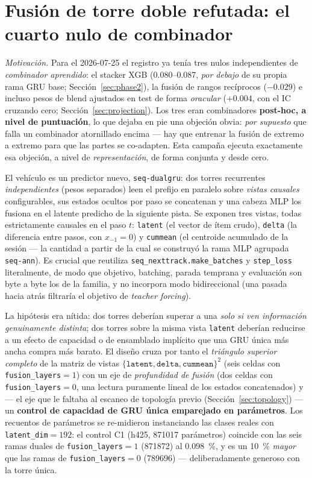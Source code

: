 \documentclass[11pt]{article}
\begin{document}
\section{Fusión de torre doble refutada: el cuarto nulo de combinador}
\label{sec:dualtower}
\emph{Motivación.} Para el 2026-07-25 el registro ya tenía tres nulos
independientes de \emph{combinador aprendido}: el stacker XGB
(\numrange{0.080}{0.087}, \emph{por debajo} de su propia rama GRU base;
Sección~\ref{sec:phase2}), la fusión de rangos recíprocos ($-\num{0.029}$) e
incluso pesos de blend ajustados en test de forma \emph{oracular}
($+\num{0.004}$, con el IC cruzando cero; Sección~\ref{sec:projection}). Los
tres eran combinadores \textbf{post-hoc, a nivel de puntuación}, lo que dejaba en
pie una objeción obvia: \emph{por supuesto} que falla un combinador atornillado
encima --- hay que entrenar la fusión de extremo a extremo para que las partes se
co-adapten. Esta campaña ejecuta exactamente esa objeción, a nivel de
\emph{representación}, de forma conjunta y desde cero.

El vehículo es un predictor nuevo, \texttt{seq-dualgru}: dos torres recurrentes
\emph{independientes} (pesos separados) leen el prefijo en paralelo sobre
\emph{vistas causales} configurables, sus estados ocultos por paso se concatenan
y una cabeza MLP los fusiona en el latente predicho de la siguiente pista. Se
exponen tres vistas, todas estrictamente causales en el paso $t$:
\texttt{latent} (el vector de ítem crudo), \texttt{delta} (la diferencia entre
pasos, con $x_{-1}=0$) y \texttt{cummean} (el centroide acumulado de la sesión
--- la cantidad a partir de la cual se construyó la rama MLP agrupada
\texttt{seq-ann}). Es crucial que reutiliza \texttt{seq\_nexttrack.make\_batches}
y \texttt{step\_loss} literalmente, de modo que objetivo, batching, parada
temprana y evaluación son byte a byte los de la familia, y no incorpora modo
bidireccional (una pasada hacia atrás filtraría el objetivo de
\emph{teacher forcing}).

La hipótesis era nítida: dos torres deberían superar a una \emph{solo si ven
información genuinamente distinta}; dos torres sobre la misma vista
\texttt{latent} deberían reducirse a un efecto de capacidad o de ensamblado
implícito que una GRU única más ancha compra más barato. El diseño cruza por
tanto el \emph{triángulo superior completo} de la matriz de vistas
$\{\texttt{latent},\texttt{delta},\texttt{cummean}\}^2$ (seis celdas con
\texttt{fusion\_layers}${}=1$) con un eje de \emph{profundidad de fusión} (dos
celdas con \texttt{fusion\_layers}${}=0$, una lectura puramente lineal de los
estados concatenados) y --- el eje que le faltaba al escaneo de topología previo
(Sección~\ref{sec:topology}) --- un \textbf{control de capacidad de GRU única
emparejado en parámetros}. Los recuentos de parámetros se re-midieron
instanciando las clases reales con \texttt{latent\_dim}${}=192$: el control C1
(h425, \num{871017} parámetros) coincide con las seis ramas duales de
\texttt{fusion\_layers}${}=1$ (\num{871872}) al \SI{0.098}{\percent}, y es un
\SI{10}{\percent} \emph{mayor} que las ramas de \texttt{fusion\_layers}${}=0$
(\num{789696}) --- deliberadamente generoso con la torre única.
\end{document}
